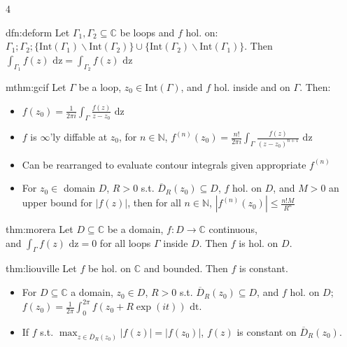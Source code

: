 \documentclass[landscape, 8pt]{extarticle}
\begin{document}
\begin{multicols*}{4}
	
	\begin{thm}{dfn:deform}{ }
		Let $\Gamma_1, \Gamma_2 \subseteq \mathbb{C}$ be loops and $f$ hol. on: $\Gamma_1; \Gamma_2; \{\text{Int}(\Gamma_1) \backslash \text{Int}(\Gamma_2)\} \cup \{\text{Int}(\Gamma_2) \backslash \text{Int}(\Gamma_1)\}$. Then $\int_{\Gamma_1}f(z) \text{ dz} = \int_{\Gamma_2}f(z) \text{ dz}$
		
		
	\end{thm}
	
	
	\begin{mthm}{mthm:gcif}{ }
		Let $\Gamma$ be a loop, $z_0 \in \text{Int}(\Gamma)$, and $f$ hol. inside and on $\Gamma$. Then:
		\begin{itemize}
			\item[*] $f(z_0) = \frac{1}{2 \pi i} \int_{\Gamma}\frac{f(z)}{z-z_0} \text{ dz}$
			\vspace{-3pt}
			\item[*] $f$ is $\infty$'ly diffable at $z_0$, for $n \in \mathbb{N}$, $f^{(n)}(z_0) = \frac{n!}{2 \pi i} \int_{\Gamma}\frac{f(z)}{(z-z_0)^{n+1}} \text{ dz}$
			\vspace{-2pt}
			\item Can be rearranged to evaluate contour integrals given appropriate $f^{(n)}$
			\item For $z_0 \in$ domain $D$, $R > 0$ s.t. $\overline{D}_R(z_0) \subseteq D$, $f$ hol. on $D$, and $M>0$ an upper bound for $\left|f(z)\right|$, then for all $n \in \mathbb{N}$, $\left|f^{(n)}(z_0)\right| \le \frac{n!M}{R^n}$
		\end{itemize}
		
	\end{mthm}	
	
	
	\begin{thm}{thm:morera}{ }
		Let $D \subseteq \mathbb{C}$ be a domain, $f: D \to \mathbb{C}$ continuous, \\
		and $\int_{\Gamma}f(z) \text{ dz} = 0$ for all loops $\Gamma$ inside $D$. Then $f$ is hol. on $D$.
		
	\end{thm}
	
	
	\begin{thm}{thm:liouville}{ }
		Let $f$ be hol. on $\mathbb{C}$ and bounded. Then $f$ is constant.
		\begin{itemize}
			\item For $D \subseteq \mathbb{C}$ a domain, $z_0 \in D$, $R>0$ s.t. $\overline{D}_R(z_0) \subseteq D$, and $f$ hol. on $D$;\\
			$f(z_0) = \frac{1}{2 \pi} \int_{0}^{2 \pi}f(z_0 + R \exp(it)) \text{ dt}.$
			\item If $f$ s.t. $\max_{z \in \overline{D}_R(z_0)}\left|f(z)\right| = \left|f(z_0)\right|$, $f(z)$ is constant on $\overline{D}_R(z_0)$.
		\end{itemize}
		

\end{thm}
\end{multicols*}
\end{document}
